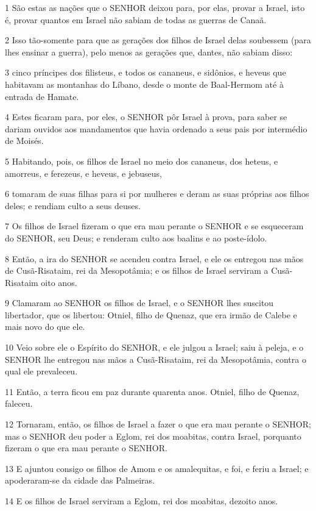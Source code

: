 \par 1 São estas as nações que o SENHOR deixou para, por elas, provar a Israel, isto é, provar quantos em Israel não sabiam de todas as guerras de Canaã.
\par 2 Isso tão-somente para que as gerações dos filhos de Israel delas soubessem (para lhes ensinar a guerra), pelo menos as gerações que, dantes, não sabiam disso:
\par 3 cinco príncipes dos filisteus, e todos os cananeus, e sidônios, e heveus que habitavam as montanhas do Líbano, desde o monte de Baal-Hermom até à entrada de Hamate.
\par 4 Estes ficaram para, por eles, o SENHOR pôr Israel à prova, para saber se dariam ouvidos aos mandamentos que havia ordenado a seus pais por intermédio de Moisés.
\par 5 Habitando, pois, os filhos de Israel no meio dos cananeus, dos heteus, e amorreus, e ferezeus, e heveus, e jebuseus,
\par 6 tomaram de suas filhas para si por mulheres e deram as suas próprias aos filhos deles; e rendiam culto a seus deuses.
\par 7 Os filhos de Israel fizeram o que era mau perante o SENHOR e se esqueceram do SENHOR, seu Deus; e renderam culto aos baalins e ao poste-ídolo.
\par 8 Então, a ira do SENHOR se acendeu contra Israel, e ele os entregou nas mãos de Cusã-Risataim, rei da Mesopotâmia; e os filhos de Israel serviram a Cusã-Risataim oito anos.
\par 9 Clamaram ao SENHOR os filhos de Israel, e o SENHOR lhes suscitou libertador, que os libertou: Otniel, filho de Quenaz, que era irmão de Calebe e mais novo do que ele.
\par 10 Veio sobre ele o Espírito do SENHOR, e ele julgou a Israel; saiu à peleja, e o SENHOR lhe entregou nas mãos a Cusã-Risataim, rei da Mesopotâmia, contra o qual ele prevaleceu.
\par 11 Então, a terra ficou em paz durante quarenta anos. Otniel, filho de Quenaz, faleceu.
\par 12 Tornaram, então, os filhos de Israel a fazer o que era mau perante o SENHOR; mas o SENHOR deu poder a Eglom, rei dos moabitas, contra Israel, porquanto fizeram o que era mau perante o SENHOR.
\par 13 E ajuntou consigo os filhos de Amom e os amalequitas, e foi, e feriu a Israel; e apoderaram-se da cidade das Palmeiras.
\par 14 E os filhos de Israel serviram a Eglom, rei dos moabitas, dezoito anos.
